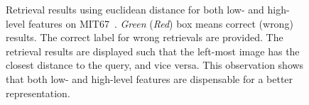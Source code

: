 \documentclass[10pt,twocolumn,letterpaper]{article}
\begin{document}
\begin{figure}[htbp]
\centering

\caption{Retrieval results using euclidean distance for both low- and high-level features on MIT67~\cite{MIT67}. \textit{Green} (\textit{Red}) box means correct (wrong) results. The correct label for wrong retrievals are provided. The retrieval results are displayed such that the left-most image has the closest distance to the query, and vice versa. This observation shows that both low- and high-level features are dispensable for a better representation.}

\label{fig:moti}
\end{figure}
\end{document}
